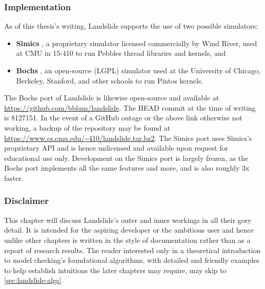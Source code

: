 \subsubsection{Implementation}

As of this thesis's writing, Landslide supports the use of two possible simulators:

\begin{itemize}
	\item {\bf Simics} \cite{simics}, a proprietary simulator licensed commercially by Wind River, used at CMU in 15-410 to run Pebbles thread libraries and kernels, and
	\item {\bf Bochs} \cite{bochs}, an open-source (LGPL) simulator used at the University of Chicago, Berkeley, Stanford, and other schools to run Pintos kernels.
\end{itemize}

The Bochs port of Landslide is likewise open-source
and available at \url{https://github.com/bblum/landslide}.
The HEAD commit at the time of writing is 8127151.
In the event of a GitHub outage or the above link otherwise not working,
a backup of the repository
may be found at
\url{https://www.cs.cmu.edu/~410/landslide.tar.bz2}.
%
The Simics port uses Simics's proprietary API and is hence unlicensed and available upon request for educational use only.
Development on the Simics port is largely frozen,
as the Bochs port implements all the same features and more,
and is also roughly 3x faster.

\subsubsection{Disclaimer}

This chapter will discuss Landslide's outer and inner workings in all their gory detail.
It is intended for the aspiring developer or the ambitious user
and hence unlike other chapters is written in the style of documentation rather than as a report of research results.
The reader interested only in a theoretical introduction to model checking's foundational algorithms,
with detailed and friendly examples to help establish intuitions the later chapters may require,
may skip to \cref{sec:landslide-algs}.



